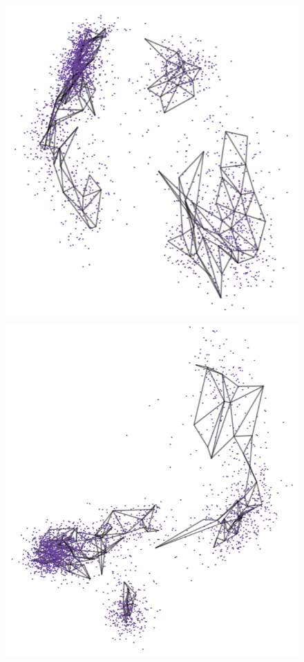 \documentclass[
  12pt]{article}
\begin{document}
\begin{figure}[H]
\begin{minipage}{0.33\linewidth}
\includegraphics{figures/pbmc3k/sc_1.png}\end{minipage}%
%
\begin{minipage}{0.33\linewidth}
\includegraphics{figures/pbmc3k/sc_2.png}\end{minipage}%

\end{figure}
\end{document}
